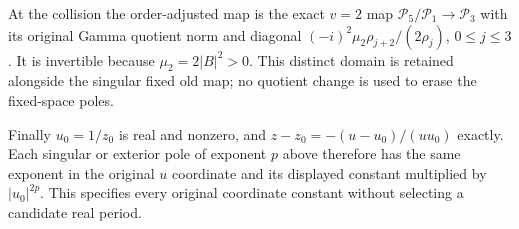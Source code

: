 At the collision the order-adjusted map is the exact $v=2$ map
$\mathcal P_5/\mathcal P_1\to\mathcal P_3$ with its original
Gamma quotient norm and diagonal
$(-i)^2\mu_2\rho_{j+2}/(2\rho_j)$, $0\le j\le3$.
It is invertible because $\mu_2=2|B|^2>0$.
This distinct domain is retained alongside the singular fixed old
map; no quotient change is used to erase the fixed-space poles.

Finally $u_0=1/z_0$ is real and nonzero, and
$z-z_0=-(u-u_0)/(uu_0)$ exactly.
Each singular or exterior pole of exponent $p$ above therefore has
the same exponent in the original $u$ coordinate and its displayed
constant multiplied by $|u_0|^{2p}$. This specifies every original
coordinate constant without selecting a candidate real period.
